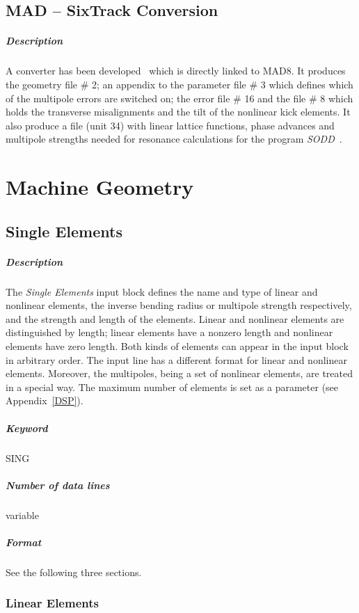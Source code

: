 \documentclass[a4paper,11pt]{report}
\begin{document}
\subsection{MAD -- SixTrack Conversion} \label{MADT}

\subparagraph{Description}

A converter has been developed~\cite{CONVERTOR} which is directly
linked to MAD8\@. It produces the geometry file \# 2; an appendix to
the parameter file \# 3 which defines which of the multipole errors
are switched on; the error file \# 16 and the file \# 8 which
holds the transverse misalignments and the tilt of the nonlinear kick
elements. It also produce a file (unit 34) with linear lattice
functions, phase advances and multipole strengths needed for resonance
calculations for the program {\it SODD}~\cite{SODD}. 

\section{Machine Geometry} \label{MaGe}

\subsection{Single Elements} \label{SinEle}

\subparagraph{Description} The {\em Single Elements} \/input block
defines the name and type of linear and nonlinear elements, the
inverse bending radius or multipole strength respectively, and the
strength and length of the elements.  Linear and nonlinear elements
are distinguished by length; linear elements have a nonzero length and
nonlinear elements have zero length. Both kinds of elements can appear
in the input block in arbitrary order. The input line has a different
format for linear and nonlinear elements.  Moreover, the multipoles,
being a set of nonlinear elements, are treated in a special way. The
maximum number of elements is set as a parameter (see
Appendix~\ref{DSP}).

\subparagraph{Keyword} SING \subparagraph{Number of data lines}
variable

\subparagraph{Format} See the following three sections.

\subsubsection{Linear Elements} \label{LinEle}
\end{document}
